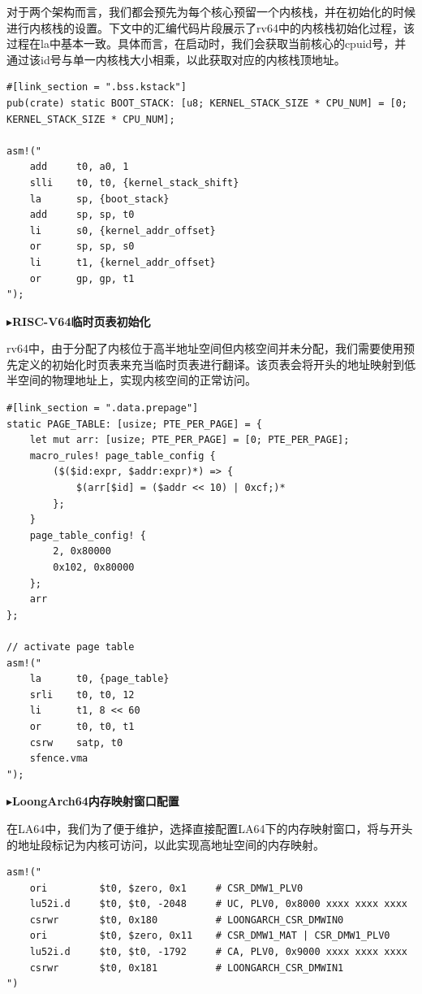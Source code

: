 \documentclass{article}
\begin{document}
对于两个架构而言，我们都会预先为每个核心预留一个内核栈，并在初始化的时候进行内核栈的设置。下文中的汇编代码片段展示了rv64中的内核栈初始化过程，该过程在la中基本一致。具体而言，在启动时，我们会获取当前核心的cpuid号，并通过该id号与单一内核栈大小相乘，以此获取对应的内核栈顶地址。

\begin{lstlisting}
#[link_section = ".bss.kstack"]
pub(crate) static BOOT_STACK: [u8; KERNEL_STACK_SIZE * CPU_NUM] = [0; KERNEL_STACK_SIZE * CPU_NUM];

asm!("
    add     t0, a0, 1
    slli    t0, t0, {kernel_stack_shift}
    la      sp, {boot_stack}
    add     sp, sp, t0
    li      s0, {kernel_addr_offset}
    or      sp, sp, s0
    li      t1, {kernel_addr_offset}
    or      gp, gp, t1
");
\end{lstlisting}

$\blacktriangleright$\textbf{RISC-V64临时页表初始化}

rv64中，由于分配了内核位于高半地址空间但内核空间并未分配，我们需要使用预先定义的初始化时页表来充当临时页表进行翻译。该页表会将开头的地址映射到低半空间的物理地址上，实现内核空间的正常访问。

\begin{lstlisting}
#[link_section = ".data.prepage"]
static PAGE_TABLE: [usize; PTE_PER_PAGE] = {
    let mut arr: [usize; PTE_PER_PAGE] = [0; PTE_PER_PAGE];
    macro_rules! page_table_config {
        ($($id:expr, $addr:expr)*) => {
            $(arr[$id] = ($addr << 10) | 0xcf;)*
        };
    }
    page_table_config! {
        2, 0x80000
        0x102, 0x80000
    };
    arr
};

// activate page table
asm!("
    la      t0, {page_table}
    srli    t0, t0, 12
    li      t1, 8 << 60
    or      t0, t0, t1
    csrw    satp, t0
    sfence.vma
");
\end{lstlisting}

$\blacktriangleright$\textbf{LoongArch64内存映射窗口配置}

在LA64中，我们为了便于维护，选择直接配置LA64下的内存映射窗口，将与开头的地址段标记为内核可访问，以此实现高地址空间的内存映射。

\begin{lstlisting}
asm!("
    ori         $t0, $zero, 0x1     # CSR_DMW1_PLV0
    lu52i.d     $t0, $t0, -2048     # UC, PLV0, 0x8000 xxxx xxxx xxxx
    csrwr       $t0, 0x180          # LOONGARCH_CSR_DMWIN0
    ori         $t0, $zero, 0x11    # CSR_DMW1_MAT | CSR_DMW1_PLV0
    lu52i.d     $t0, $t0, -1792     # CA, PLV0, 0x9000 xxxx xxxx xxxx
    csrwr       $t0, 0x181          # LOONGARCH_CSR_DMWIN1
")
\end{lstlisting}
\end{document}
